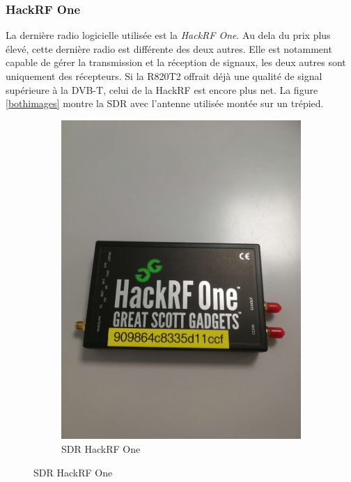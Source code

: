 \subsubsection{HackRF One}

La dernière radio logicielle utilisée est la \textit{HackRF One}. Au dela du prix plus élevé, cette dernière radio est différente des deux autres. Elle est notamment capable de gérer la transmission et la réception de signaux, les deux autres sont uniquement des récepteurs. Si la R820T2 offrait déjà une qualité de signal supérieure à la DVB-T, celui de la HackRF est encore plus net. La figure \ref{bothimages} montre la SDR avec l'antenne utilisée montée sur un trépied.

\begin{figure}[h]
\centering
\begin{subfigure}{0.4\textwidth}
  \centering
  \includegraphics[width=\textwidth]{images/hackrf.png}
  \caption{SDR HackRF One}
  \label{term330}
\end{subfigure}

\end{figure}
